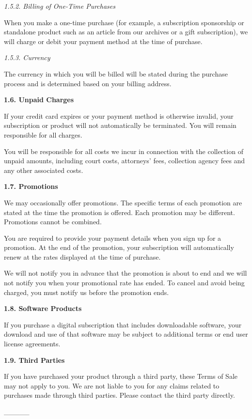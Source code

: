 \emph{1.5.2. Billing of One-Time Purchases}

When you make a one-time purchase (for example, a subscription
sponsorship or standalone product such as an article from our archives
or a gift subscription), we will charge or debit your payment method at
the time of purchase.

\emph{1.5.3. Currency}

The currency in which you will be billed will be stated during the
purchase process and is determined based on your billing address.

\textbf{1.6. Unpaid Charges}

If your credit card expires or your payment method is otherwise invalid,
your subscription or product will not automatically be terminated. You
will remain responsible for all charges.

You will be responsible for all costs we incur in connection with the
collection of unpaid amounts, including court costs, attorneys' fees,
collection agency fees and any other associated costs.

\textbf{1.7. Promotions}

We may occasionally offer promotions. The specific terms of each
promotion are stated at the time the promotion is offered. Each
promotion may be different. Promotions cannot be combined.

You are required to provide your payment details when you sign up for a
promotion. At the end of the promotion, your subscription will
automatically renew at the rates displayed at the time of purchase.

We will not notify you in advance that the promotion is about to end and
we will not notify you when your promotional rate has ended. To cancel
and avoid being charged, you must notify us before the promotion ends.

\textbf{1.8. Software Products}

If you purchase a digital subscription that includes downloadable
software, your download and use of that software may be subject to
additional terms or end user license agreements.

\textbf{1.9. Third Parties}

If you have purchased your product through a third party, these Terms of
Sale may not apply to you. We are not liable to you for any claims
related to purchases made through third parties. Please contact the
third party directly.

\_\_\_\_\_

